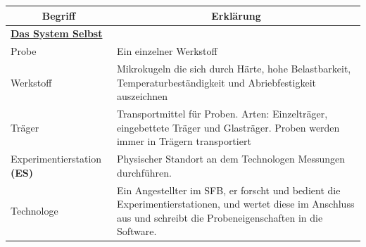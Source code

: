 \documentclass[enabledeprecatedfontcommands,fontsize=12pt,paper=a4,twoside]{scrartcl}
\begin{document}
\begin{longtable}[c]{|p{7cm}|p{8cm}|}
\hline
\multicolumn{1}{|c|}{\textbf{Begriff}}                          & \multicolumn{1}{c|}{\textbf{Erklärung}}                                                                                                                                                                                                               \\ \hline
\endhead
%
\multicolumn{2}{|l|}{{\ul \textbf{Das System Selbst}}}                                                                                                                                                                                                                                                                  \\ \hline
Probe                                                           & Ein einzelner Werkstoff                                                                                                                                                                                                                              \\ \hline
Werkstoff                                                       & Mikrokugeln die sich durch Härte, hohe Belastbarkeit, Temperaturbeständigkeit und Abriebfestigkeit auszeichnen                                                                                                                                     \\ \hline
Träger                                                          & Transportmittel für Proben. Arten: Einzelträger, eingebettete Träger und Glasträger. Proben werden immer in Trägern transportiert                                                                                                                     \\ \hline
Experimentierstation \textbf{(ES)}             & Physischer Standort an dem Technologen Messungen durchführen.                                                                                                                                                                                     \\ \hline
Technologe                                                      & Ein Angestellter im SFB, er forscht und bedient die Experimentierstationen, und wertet diese im Anschluss aus und schreibt die Probeneigenschaften in die Software.                                                                                                  \\ \hline

\end{longtable}
\end{document}
